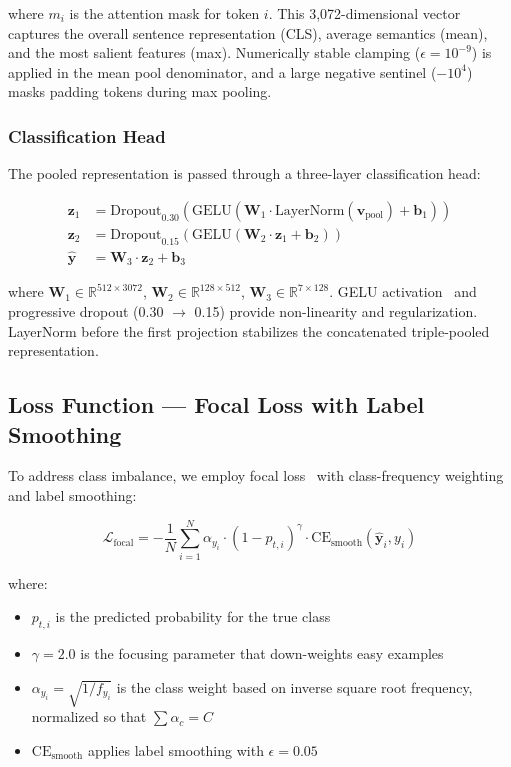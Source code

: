 \documentclass[conference, 10pt]{IEEEtran}
\begin{document}
where $m_i$ is the attention mask for token $i$. This 3,072-dimensional vector captures the overall sentence representation (CLS), average semantics (mean), and the most salient features (max). Numerically stable clamping ($\epsilon = 10^{-9}$) is applied in the mean pool denominator, and a large negative sentinel ($-10^{4}$) masks padding tokens during max pooling.

\subsubsection{Classification Head}

The pooled representation is passed through a three-layer classification head:

\begin{equation}
\begin{aligned}
    \mathbf{z}_1 &= \text{Dropout}_{0.30}(\text{GELU}(\mathbf{W}_1 \cdot \text{LayerNorm}(\mathbf{v}_{\text{pool}}) + \mathbf{b}_1)) \\
    \mathbf{z}_2 &= \text{Dropout}_{0.15}(\text{GELU}(\mathbf{W}_2 \cdot \mathbf{z}_1 + \mathbf{b}_2)) \\
    \hat{\mathbf{y}} &= \mathbf{W}_3 \cdot \mathbf{z}_2 + \mathbf{b}_3
\end{aligned}
\end{equation}

where $\mathbf{W}_1 \in \mathbb{R}^{512 \times 3072}$, $\mathbf{W}_2 \in \mathbb{R}^{128 \times 512}$, $\mathbf{W}_3 \in \mathbb{R}^{7 \times 128}$. GELU activation~\cite{hendrycks2016gelu} and progressive dropout (0.30 $\to$ 0.15) provide non-linearity and regularization. LayerNorm before the first projection stabilizes the concatenated triple-pooled representation.

\subsection{Loss Function — Focal Loss with Label Smoothing}

To address class imbalance, we employ focal loss~\cite{lin2017focal} with class-frequency weighting and label smoothing:

\begin{equation}
    \mathcal{L}_{\text{focal}} = -\frac{1}{N} \sum_{i=1}^{N} \alpha_{y_i} \cdot (1 - p_{t,i})^{\gamma} \cdot \text{CE}_{\text{smooth}}(\hat{\mathbf{y}}_i, y_i)
    \label{eq:focal}
\end{equation}

where:
\begin{itemize}[noitemsep]
    \item $p_{t,i}$ is the predicted probability for the true class
    \item $\gamma = 2.0$ is the focusing parameter that down-weights easy examples
    \item $\alpha_{y_i} = \sqrt{1/f_{y_i}}$ is the class weight based on inverse square root frequency, normalized so that $\sum \alpha_c = C$
    \item $\text{CE}_{\text{smooth}}$ applies label smoothing with $\epsilon = 0.05$
\end{itemize}
\end{document}
